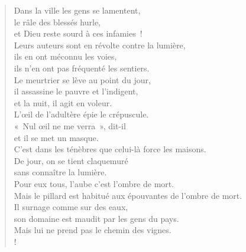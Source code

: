 \documentclass[french,twoside]{book} %
\def\mednobreak{\ifdim\lastskip<\medskipamount
  \removelastskip\nopagebreak\medskip\fi}
\newcommand{\labelblock}[1]{\medbreak{\noindent\color{rubric}\bfseries #1}\par\mednobreak}
\begin{document}
\begin{verse}
Dans la ville les gens se lamentent, \\
le râle des blessés hurle, \\
et Dieu reste sourd à ces infamies !\\
Leurs auteurs sont en révolte contre la lumière, \\
ils en ont méconnu les voies, \\
ils n’en ont pas fréquenté les sentiers.\\
Le meurtrier se lève au point du jour, \\
il assassine le pauvre et l’indigent, \\
et la nuit, il agit en voleur.\\
L’œil de l’adultère épie le crépuscule. \\
« Nul œil ne me verra », dit-il \\
et il se met un masque.\\
C’est dans les ténèbres que celui-là force les maisons. \\
De jour, on se tient claquemuré \\
sans connaître la lumière.\\
Pour eux tous, l’aube c’est l’ombre de mort. \\
Mais le pillard est habitué aux épouvantes de l’ombre de mort.\\
Il surnage comme sur des eaux, \\
son domaine est maudit par les gens du pays. \\
Mais lui ne prend pas le chemin des vignes.\\!
\end{verse}

\labelblock{Dogme et réalité}
\end{document}
